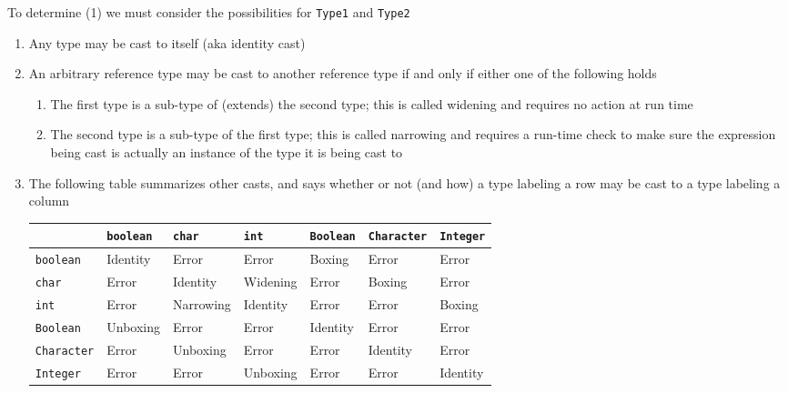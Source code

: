 \documentclass[8pt,a4paper,compress]{beamer}
\begin{document}
\begin{frame}[fragile]
\pause

To determine (1) we must consider the possibilities for \lstinline{Type1} and \lstinline{Type2}
\begin{enumerate}
\pause
\item Any type may be cast to itself (aka identity cast)
\pause
\item An arbitrary reference type may be cast to another reference type if and only if either one of the following holds
\begin{enumerate}
\pause
\item The first type is a sub-type of (extends) the second type; this is called widening and requires no action at run time
\pause
\item The second type is a sub-type of the first type; this is called narrowing and requires a run-time check to make sure the expression being cast is actually an instance of the type it is being cast to
\end{enumerate}
\pause
\item The following table summarizes other casts, and says whether or not (and how) a type labeling a row may be cast to a type labeling a column
\begin{center}
    \begin{tabular}{ | l | l | l | l | l | l | l | }
    \hline
    & \lstinline$boolean$   & \lstinline$char$    & \lstinline$int$ & \lstinline$Boolean$ &
                \lstinline$Character$ & \lstinline$Integer$   \\ \hline

   \lstinline$boolean$   & Identity & Error     & Error    & Boxing  & Error  & Error \\ \hline
   \lstinline$char$      & Error    & Identity  & Widening & Error   & Boxing & Error \\ \hline
   \lstinline$int$       & Error    & Narrowing & Identity & Error   & Error      & Boxing \\ \hline
   \lstinline$Boolean$   & Unboxing & Error     & Error    & Identity & Error   & Error \\ \hline
   \lstinline$Character$ & Error    & Unboxing  & Error    & Error    & Identity & Error \\ \hline
   \lstinline$Integer$   & Error    & Error     & Unboxing & Error    & Error   & Identity \\ \hline
    \end{tabular}
\end{center}
\end{enumerate}
\end{frame}
\end{document}

